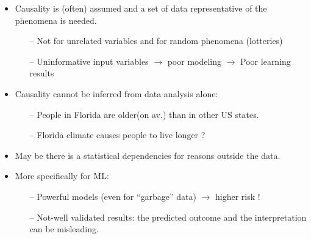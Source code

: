 \documentclass[../main.tex]{subfiles}
\begin{document}
\begin{itemize}
    \item Causality is (often) assumed and a set of data representative of the phenomena is needed.
         \begin{itemize}
	     \item[--] Not for unrelated variables and for random phenomena (lotteries)
	     \item[--] Uninformative input variables $\rightarrow$ poor modeling $\rightarrow$ Poor learning results
         \end{itemize}
    \item Causality cannot be inferred from data analysis alone:
        \begin{itemize}
	    \item[--] People in Florida are older(on av.) than in other US states.
	    \item[--] Florida climate causes people to live longer ?
        \end{itemize}
    \item May be there is a statistical dependencies for reasons outside the data.
    \item More specifically for ML:
        \begin{itemize}
	    \item[--] Powerful models (even for “garbage” data) $\rightarrow$ higher risk !
	    \item[--] Not-well validated results: the predicted outcome and the interpretation can be misleading.
        \end{itemize}

\end{itemize}
\end{document}
